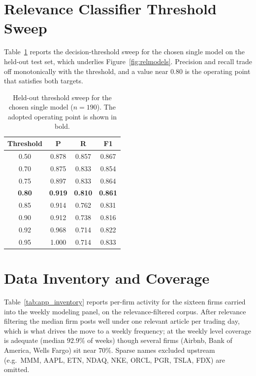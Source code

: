 \documentclass[conference]{IEEEtran}
\begin{document}
\appendix
\section{Relevance Classifier Threshold Sweep}
Table~\ref{tab:relsweep} reports the decision-threshold sweep for the chosen
single model on the held-out test set, which underlies
Figure~\ref{fig:relmodels}. Precision and recall trade off monotonically with the
threshold, and a value near $0.80$ is the operating point that satisfies both
targets.

\begin{table}[!h]
\caption{Held-out threshold sweep for the chosen single model ($n=190$). The
adopted operating point is shown in bold.}
\label{tab:relsweep}
\centering\small
\begin{tabular}{cccc}
\toprule
Threshold & P & R & F1 \\
\midrule
0.50 & 0.878 & 0.857 & 0.867 \\
0.70 & 0.875 & 0.833 & 0.854 \\
0.75 & 0.897 & 0.833 & 0.864 \\
\textbf{0.80} & \textbf{0.919} & \textbf{0.810} & \textbf{0.861} \\
0.85 & 0.914 & 0.762 & 0.831 \\
0.90 & 0.912 & 0.738 & 0.816 \\
0.92 & 0.968 & 0.714 & 0.822 \\
0.95 & 1.000 & 0.714 & 0.833 \\
\bottomrule
\end{tabular}
\end{table}


\section{Data Inventory and Coverage}
\label{app:inventory}
Table~\ref{tab:app_inventory} reports per-firm activity for the sixteen firms
carried into the weekly modeling panel, on the relevance-filtered corpus. After
relevance filtering the median firm posts well under one relevant article per
trading day, which is what drives the move to a weekly frequency; at the weekly
level coverage is adequate (median $92.9\%$ of weeks) though several firms
(Airbnb, Bank of America, Wells Fargo) sit near $70\%$. Sparse names excluded
upstream (e.g.\ MMM, AAPL, ETN, NDAQ, NKE, ORCL, PGR, TSLA, FDX) are omitted.
\end{document}
